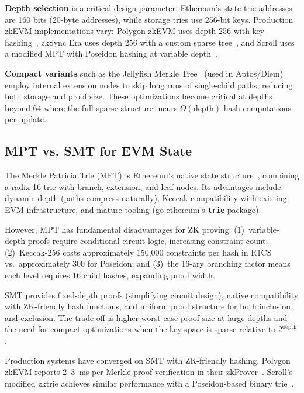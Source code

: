 \textbf{Depth selection} is a critical design parameter. Ethereum's
state trie addresses are 160 bits (20-byte addresses), while storage
tries use 256-bit keys. Production zkEVM implementations vary:
Polygon zkEVM uses depth 256 with key hashing~\cite{polygon2024zkprover},
zkSync Era uses depth 256 with a custom sparse
tree~\cite{zksync2024boojum}, and Scroll uses a modified MPT
with Poseidon hashing at variable depth~\cite{scroll2024architecture}.

\textbf{Compact variants} such as the Jellyfish Merkle
Tree~\cite{aptos2024jellyfish} (used in Aptos/Diem) employ
internal extension nodes to skip long runs of single-child
paths, reducing both storage and proof size. These optimizations
become critical at depths beyond 64 where the full sparse
structure incurs $O(\text{depth})$ hash computations per update.

\subsection{MPT vs. SMT for EVM State}

The Merkle Patricia Trie (MPT) is Ethereum's native state
structure~\cite{wood2024ethereum}, combining a radix-16 trie with
branch, extension, and leaf nodes. Its advantages include:
dynamic depth (paths compress naturally), Keccak compatibility with
existing EVM infrastructure, and mature tooling (go-ethereum's
\texttt{trie} package).

However, MPT has fundamental disadvantages for ZK proving:
(1)~variable-depth proofs require conditional circuit logic,
increasing constraint count; (2)~Keccak-256 costs approximately
150,000 constraints per hash in R1CS~\cite{grassi2021poseidon}
vs.\ approximately 300 for Poseidon; and (3)~the 16-ary branching
factor means each level requires 16 child hashes, expanding
proof width.

SMT provides fixed-depth proofs (simplifying circuit design),
native compatibility with ZK-friendly hash functions, and
uniform proof structure for both inclusion and exclusion.
The trade-off is higher worst-case proof size at large depths
and the need for compact optimizations when the key space
is sparse relative to $2^{\text{depth}}$.

Production systems have converged on SMT with ZK-friendly hashing.
Polygon zkEVM reports 2--3~ms per Merkle proof verification in
their zkProver~\cite{polygon2024zkprover}. Scroll's modified
zktrie achieves similar performance with a Poseidon-based binary
trie~\cite{scroll2024architecture}.

